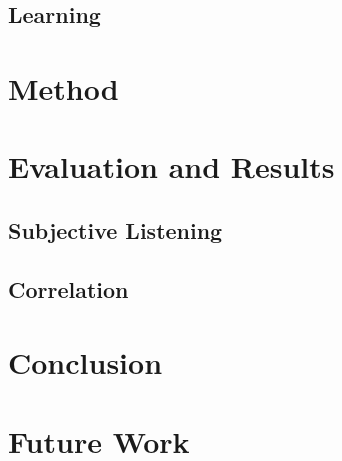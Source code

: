 \documentclass[a4paper,10pt]{article}
\begin{document}
\subsection{Learning}


\section{Method}
\section{Evaluation and Results}
\subsection{Subjective Listening}
\subsection{Correlation}
\section{Conclusion}
\cite{markwin}
\section{Future Work}

  
 
 
\end{document}
